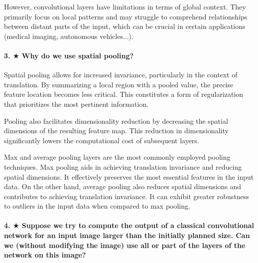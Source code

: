 \documentclass{article}
\theoremstyle{plain}%
\theoremstyle{definition}
\theoremstyle{remark}
\begin{document}
However, convolutional layers have limitations in terms of global context. They primarily focus on local patterns and may struggle to comprehend relationships between distant parts of the input, which can be crucial in certain applications (medical imaging, autonomous vehicles...).

\paragraph{3. $ \bigstar $ Why do we use spatial pooling?}
Spatial pooling allows for increased invariance, particularly in the context of translation. By summarizing a local region with a pooled value, the precise feature location becomes less critical. This constitutes a form of regularization that prioritizes the most pertinent information.

Pooling also facilitates dimensionality reduction by decreasing the spatial dimensions of the resulting feature map. This reduction in dimensionality significantly lowers the computational cost of subsequent layers.

Max and average pooling layers are the most commonly employed pooling techniques. Max pooling aids in achieving translation invariance and reducing spatial dimensions. It effectively preserves the most essential features in the input data. On the other hand, average pooling also reduces spatial dimensions and contributes to achieving translation invariance. It can exhibit greater robustness to outliers in the input data when compared to max pooling.

\paragraph{4. $ \bigstar $ Suppose we try to compute the output of a classical convolutional network for an input image larger than the initially planned size. Can we (without modifying the image) use all or part of the layers of the network on this image?}

\end{document}
